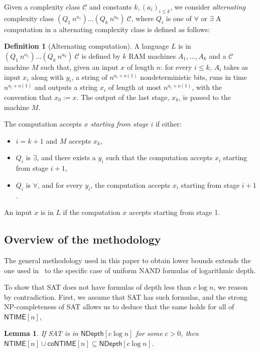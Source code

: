 \documentclass[a4paper, 11pt]{article}
\theoremstyle{plain}
\newtheorem{lemma}[theorem]{Lemma}
\theoremstyle{definition}
\newtheorem{definition}[theorem]{Definition}
\theoremstyle{remark}
\newcommand{\Cc}{\mathcal{C}}%
\newcommand{\NP}{\textsf{NP}}%
\newcommand{\NTIME}{\textsf{NTIME}}%
\newcommand{\coNTIME}{\textsf{coNTIME}}%
\newcommand{\SAT}{\textsf{SAT}}%
\newcommand{\ND}{\textsf{NDepth}}%
\newcommand{\NDL}[1]{\ND\left[ #1 \log n\right]}%
\begin{document}
Given a complexity class $\Cc$ and constants $k, (a_i)_{i\leq k}$, 
we consider \textit{alternating} complexity
class $(Q_1~n^{a_1})\ldots(Q_k~n^{a_k})~\Cc$, 
where $Q_i$ is one of $\forall$ or $\exists$
A computation in a alternating complexity class is defined as follows:
\begin{definition}[Alternating computation]
	A language $L$ is in $(Q_1~n^{a_1})\ldots(Q_k~n^{a_k})~\Cc$ 
	is defined by $k$ RAM machines $A_1, \ldots, A_k$ and a $\Cc$ machine $M$
	such that, given an input $x$ of length $n$:
	for every $i \le k$, $A_{i}$ takes as input $x_i$ along with $y_i$, 
	a string of $n^{a_{i} + o(1)}$ nondeterministic bits,
	runs in time $n^{a_{i} + o(1)}$ and outputs a string $x_{i}$ of length at most $n^{a_{i} + o(1)}$, 
	with the convention that $x_0 := x$.
	The output of the last stage, $x_{k}$, is passed to the machine $M$. 

	The computation accepts $x$ \textit{starting from stage $i$} if either:
	\begin{itemize}
		\item $i = k+1$ and $M$ accepts $x_{k}$, 
		\item $Q_i$ is $\exists$, and there exists a $y_i$ such that the computation
		accepts $x_{i}$ starting from stage $i+1$, 
		\item $Q_i$ is $\forall$, and for every $y_i$, the computation
		accepts $x_{i}$ starting from stage $i+1$. 
	\end{itemize}

	An input $x$ is in $L$ if the computation $x$ accepts starting from stage 1.
\end{definition}

\subsection{Overview of the methodology}\label{sec:overview}

The general methodology used in this paper to obtain lower bounds
extends the one used in~\cite{williams2006inductive, mudigonda2020time}
to the specific case of uniform \textsf{NAND} formulas of logarithmic depth.

To show that \SAT{} does not have formulas of depth less than $c\log n$, 
we reason by contradiction.
First, we assume that \SAT{} has such formulas, and the strong \NP-completeness of \SAT{}
allows us to deduce that the same holds for all of $\NTIME[n]$, 
\begin{lemma}\label{lemma:usual_sd}
	If \SAT{} is in $\NDL{c}$ for some $c>0$,
	then $\NTIME[n] \cup \coNTIME[n] \subseteq \NDL{c}$.
\end{lemma}
\end{document}
